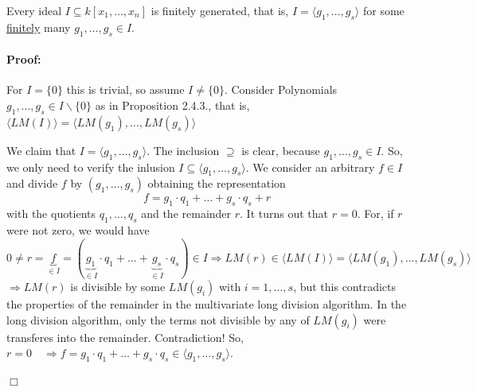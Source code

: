 \begin{theorem}[title = Theorem 2.4.4 (Hilbert's Basis Theorem)]
    Every ideal $I \subseteq k[x_1, \dots, x_n]$ is finitely generated, that is, $I = \langle g_1, \ldots, g_s \rangle $ for some \underline{finitely} many $g_1, \ldots, g_s \in I$. 

    \paragraph{Proof:} For $I = \{0\}$ this is trivial, so assume $I \neq \{0\}$. Consider Polynomials $g_1, ..., g_s \in I \backslash \{0\}$ as in Proposition 2.4.3., that is, $\langle LM(I) \rangle = \langle LM(g_1), \ldots, LM(g_s) \rangle$ \\

    \begin{center}
    \end{center}
\end{theorem}

\clearpage

\begin{theorem}[title = Theorem 2.4.4 (Hilbert's Basis Theorem) continued]
    We claim that $I = \langle g_1, \ldots, g_s \rangle$. The inclusion $\supseteq$ is clear, because $g_1, \ldots, g_s \in I$. So, we only need to verify the inlusion $ I \subseteq \langle g_1, \ldots, g_s \rangle$. We consider an arbitrary $f \in I$ and 
    divide $f$ by $(g_1, \ldots, g_s)$  obtaining the representation
    \[ f = g_1 \cdot q_1 + \ldots + g_s \cdot q_s  + r\] with the quotients $q_1, \ldots, q_s$ and the remainder $r$. It turns out that $r = 0$. For, if $r$ were not  zero, we would have 
    \[0 \neq r = \underbrace{f}_{\in I} = (\underbrace{g_1}_{\in I} \cdot q_1 + \ldots + \underbrace{g_s}_{\in I} \cdot q_s) \in I \Rightarrow LM(r) \in \langle LM(I) \rangle = \langle LM(g_1), \ldots, LM(g_s) \rangle\]
    $\Rightarrow LM(r)$ is divisible by some $LM(g_i)$ with $i = 1, \ldots, s$, but this contradicts the properties of the remainder in the multivariate long division algorithm. In the long division algorithm, only the 
    terms not divisible by any of $LM(g_i)$ were transferes into the remainder. Contradiction! So, $r = 0 \quad \Rightarrow f = g_1 \cdot q_1 + \ldots + g_s \cdot q_s \in \langle  g_1, \ldots, g_s \rangle$. 
      \begin{flushright}
        $\Box $
      \end{flushright}
\end{theorem}

